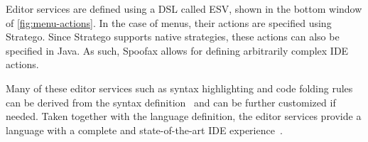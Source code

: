 Editor services are defined using a DSL called ESV, shown in the bottom
window of \cref{fig:menu-actions}. In the case of menus, their actions are
specified using Stratego. Since Stratego supports native strategies, these
actions can also be specified in Java. As such, Spoofax allows for defining
arbitrarily complex IDE actions.

Many of these editor services such as syntax highlighting and code
folding rules can be derived from the syntax
definition~\cite{Kats10c} and can be further customized if
needed. Taken together with the language definition, the editor
services provide a language with a complete and state-of-the-art IDE
experience~\cite{Kats10a}.
